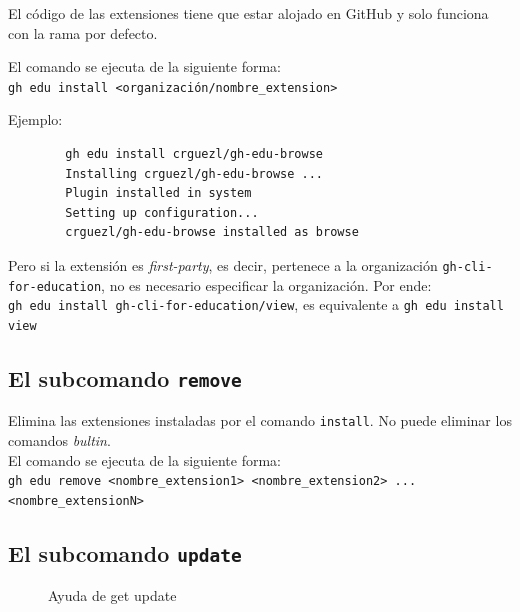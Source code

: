 El código de las extensiones tiene que estar alojado en GitHub y solo funciona con la rama por defecto.

El comando se ejecuta de la siguiente forma:\\
\verb|gh edu install <organización/nombre_extension>|

Ejemplo:

\begin{verbatim}
        gh edu install crguezl/gh-edu-browse
        Installing crguezl/gh-edu-browse ...
        Plugin installed in system
        Setting up configuration...
        crguezl/gh-edu-browse installed as browse
\end{verbatim}
Pero si la extensión es \emph{first-party}, es decir, pertenece a la organización \verb|gh-cli-for-education|, no es necesario especificar la organización. Por ende:\\
\verb|gh edu install gh-cli-for-education/view|, es equivalente a \verb|gh edu install view|

\subsection{El subcomando {\tt remove}}
Elimina las extensiones instaladas por el comando \verb|install|. No puede eliminar los comandos \emph{bultin}.\\
El comando se ejecuta de la siguiente forma:\\
\verb|gh edu remove <nombre_extension1> <nombre_extension2> ... <nombre_extensionN>|

\subsection{El subcomando {\tt update}}

\begin{figure}[htb]
    \centering
    \caption{Ayuda de get update}
    \label{fig:updateHelp}
\end{figure}

